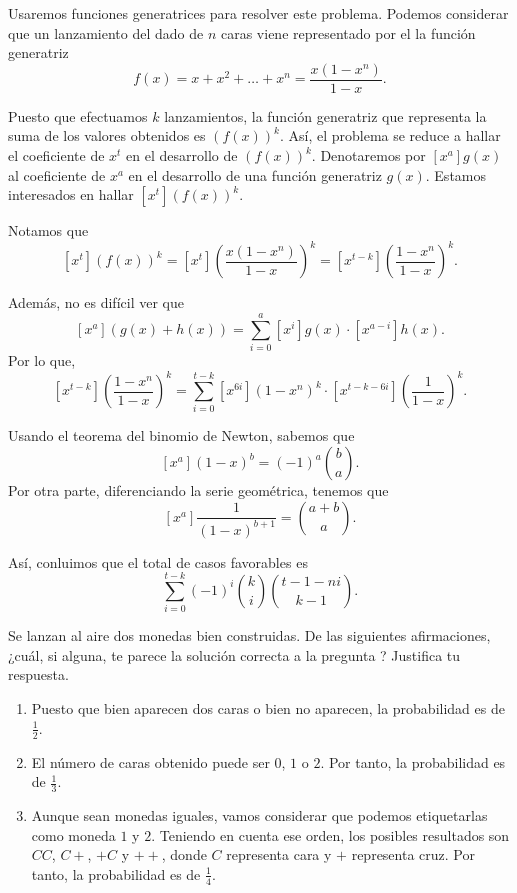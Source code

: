 \begin{solution}
  Usaremos funciones generatrices para resolver este problema. Podemos considerar que un lanzamiento del dado de $n$ caras viene representado por el la función generatriz
  \[
    f(x) = x + x^2 + \dots + x^n = \frac{x(1 - x^n)}{1 - x}.
  \]

  Puesto que efectuamos $k$ lanzamientos, la función generatriz que representa la suma de los valores obtenidos es $(f(x))^k$. Así, el problema se reduce a hallar el coeficiente de $x^t$ en el desarrollo de $(f(x))^k$. Denotaremos por $[x^a]g(x)$ al coeficiente de $x^a$ en el desarrollo de una función generatriz $g(x)$. Estamos interesados en hallar $[x^t](f(x))^k$.

  Notamos que
  \[
    [x^t](f(x))^k = [x^t]\left(\frac{x(1 - x^n)}{1 - x}\right)^k
    = [x^{t - k}]\left(\frac{1 - x^n}{1 - x}\right)^k.
  \]

  Además, no es difícil ver que
  \[
    [x^a](g(x) + h(x)) = \sum_{i = 0}^{a} [x^i]g(x) \cdot [x^{a - i}]h(x).
  \]
  Por lo que,
  \[
    [x^{t - k}]\left(\frac{1 - x^n}{1 - x}\right)^k
    = \sum_{i = 0}^{t - k} [x^{6i}](1 - x^n)^k \cdot [x^{t - k - 6i}]\left(\frac{1}{1 - x}\right)^k.
  \]

  Usando el teorema del binomio de Newton, sabemos que
  \[
    [x^a] (1 - x)^b = (-1)^a \binom{b}{a}.
  \]
  Por otra parte, diferenciando la serie geométrica, tenemos que
  \[
    [x^a]\frac{1}{(1 - x)^{b + 1}} = \binom{a + b}{a}.
  \]

  Así, conluimos que el total de casos favorables es
  \[
    \sum_{i = 0}^{t - k} (-1)^i \binom{k}{i} \binom{t - 1 - ni}{k - 1}.
  \]
\end{solution}

\begin{exercise}
  Se lanzan al aire dos monedas bien construidas. De las siguientes afirmaciones, ¿cuál, si alguna, te parece la solución correcta a la pregunta ? Justifica tu respuesta.

  \begin{enumerate}
    \item Puesto que bien aparecen dos caras o bien no aparecen, la probabilidad es de $\frac{1}{2}$.
    \item El número de caras obtenido puede ser $0$, $1$ o $2$. Por tanto, la probabilidad es de $\frac{1}{3}$.
    \item Aunque sean monedas iguales, vamos considerar que podemos etiquetarlas como moneda $1$ y $2$. Teniendo en cuenta ese orden, los posibles resultados son $CC$, $C+$, $+C$ y $++$, donde $C$ representa cara y $+$ representa cruz. Por tanto, la probabilidad es de $\frac{1}{4}$.   
  \end{enumerate}
\end{exercise}

